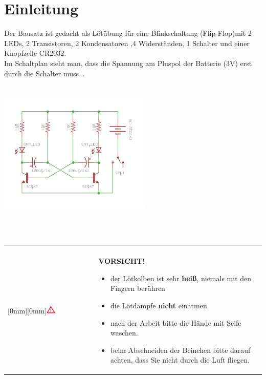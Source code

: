 \documentclass[a4paper]{article}
\newcommand\Vorsicht[1]{%
\ \\
\begin{tabular}{p{0.16\textwidth} p{0.79\textwidth}|}
\cline{2-2}
& \\
 \multirow{5}{*}{\raisebox{0mm}[0mm][0mm]{\includegraphics[width=0.1\textwidth]{../pictures/Vorsicht.png}}} & \textbf{VORSICHT!}{\begin{flushleft}#1\end{flushleft}} \\
\cline{2-2}
\end{tabular}
\ \\
}
\begin{document}
\section{Einleitung}
Der Bausatz ist gedacht als Lötübung für eine Blinkschaltung (Flip-Flop)mit 2 LEDs, 2 Transistoren, 2 Kondensatoren ,4 Widerständen, 1 Schalter und einer Knopfzelle CR2032.\\
Im Schaltplan sieht man, dass die Spannung am Pluspol der Batterie (3V) erst durch die Schalter muss...\\
\ \\
\begin{minipage}[t]{\textwidth}
  \centering
  \includegraphics[width=0.55\textwidth]{../pictures/schematic.png}
  \label{img:Schematic}
\end{minipage}
\ \\
\Vorsicht{\begin{itemize} \item der Lötkolben ist sehr \textbf{heiß}, niemals mit den Fingern berühren
\item die Lötdämpfe \textbf{nicht} einatmen \item nach der Arbeit bitte die Hände mit Seife waschen.\item beim Abschneiden der Beinchen bitte darauf achten, dass Sie nicht durch die Luft fliegen.\end{itemize}}\\
\ \\
\newpage
\end{document}

